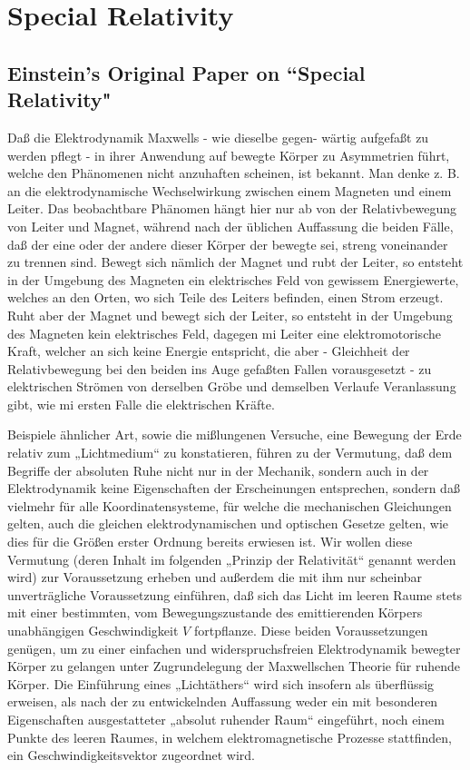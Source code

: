 \part{Special Relativity}

\chapter{Einstein's Original Paper on ``Special Relativity"}

{\German

Daß die Elektrodynamik Maxwells - wie dieselbe gegen- wärtig aufgefaßt zu werden pflegt - in ihrer Anwendung auf bewegte
Körper zu Asymmetrien führt, welche den Phänomenen nicht anzuhaften scheinen, ist bekannt. Man denke z. B. an die
elektrodynamische Wechselwirkung zwischen einem Magneten und einem Leiter. Das beobachtbare Phänomen hängt hier nur ab
von der Relativbewegung von Leiter und Magnet, während nach der üblichen Auffassung die beiden Fälle, daß der eine oder
der andere dieser Körper der bewegte sei, streng voneinander zu trennen sind. Bewegt sich nämlich der Magnet und rubt
der Leiter, so entsteht in der Umgebung des Magneten ein elektrisches Feld von gewissem Energiewerte, welches an den
Orten, wo sich Teile des Leiters befinden, einen Strom erzeugt. Ruht aber der Magnet und bewegt sich der Leiter, so
entsteht in der Umgebung des Magneten kein elektrisches Feld, dagegen mi Leiter eine elektromotorische Kraft, welcher an
sich keine Energie entspricht, die aber - Gleichheit der Relativbewegung bei den beiden ins Auge gefaßten Fallen
vorausgesetzt - zu elektrischen Strömen von derselben Gröbe und demselben Verlaufe Veranlassung gibt, wie mi ersten
Falle die elektrischen Kräfte.

Beispiele ähnlicher Art, sowie die mißlungenen Versuche, eine Bewegung der Erde relativ zum „Lichtmedium“ zu
konstatieren, führen zu der Vermutung, daß dem Begriffe der absoluten Ruhe nicht nur in der Mechanik, sondern auch in
der Elektrodynamik keine Eigenschaften der Erscheinungen entsprechen, sondern daß vielmehr für alle Koordinatensysteme,
für welche die mechanischen Gleichungen gelten, auch die gleichen elektrodynamischen und optischen Gesetze gelten, wie
dies für die Größen erster Ordnung bereits erwiesen ist. Wir wollen diese Vermutung (deren Inhalt im folgenden „Prinzip
der Relativität“ genannt werden wird) zur Voraussetzung erheben und außerdem die mit ihm nur scheinbar unverträgliche
Voraussetzung einführen, daß sich das Licht im leeren Raume stets mit einer bestimmten, vom Bewegungszustande des
emittierenden Körpers unabhängigen Geschwindigkeit $V$ fortpflanze. Diese beiden Voraussetzungen genügen, um zu einer
einfachen und widerspruchsfreien Elektrodynamik bewegter Körper zu gelangen unter Zugrundelegung der Maxwellschen
Theorie für ruhende Körper. Die Einführung eines „Lichtäthers“ wird sich insofern als überflüssig erweisen, als nach der
zu entwickelnden Auffassung weder ein mit besonderen Eigenschaften ausgestatteter „absolut ruhender Raum“ eingeführt,
noch einem Punkte des leeren Raumes, in welchem elektromagnetische Prozesse stattfinden, ein Geschwindigkeitsvektor
zugeordnet wird.

}
